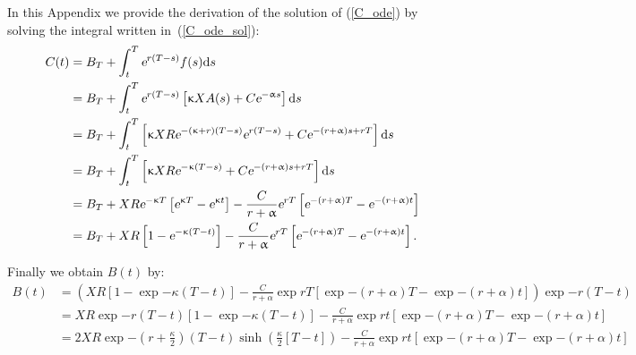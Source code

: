 In this Appendix we provide the derivation of the solution of (\ref{C_ode}) by solving the integral written in~(\ref{C_ode_sol}):
$$
\begin{aligned}
	C(t) 	&= B_T + \int_t^T \text{\sl e}^{r(T-s)}f(s)\text{\rm d} s\\
	&= B_T + \int_t^T \text{\sl e}^{r(T-s)}\left[\upkappa X A(s) + C\text{\sl e}^{-\upalpha s}\right]\text{\rm d} s\\
	&= B_T + \int_t^T \left[\upkappa X R \text{\sl e}^{- (\upkappa + r) (T-s)} \text{\sl e}^{r(T-s)} + C\text{\sl e}^{-(r+\upalpha)s+rT}\right]\text{\rm d} s\\
	&= B_T + \int_t^T \left[\upkappa X R \text{\sl e}^{-\upkappa (T-s)} + C\text{\sl e}^{-(r+\upalpha)s +rT}\right]\text{\rm d} s\\
	&= B_T + {X R \text{\sl e}^{-\upkappa T}}  \left[\text{\sl e}^{\upkappa T} - \text{\sl e}^{\upkappa t}\right] - \frac{C}{r+\upalpha}\text{\sl e}^{rT}\left[\text{\sl e}^{-(r+\upalpha)T}-\text{\sl e}^{-(r+\upalpha)t}\right]\\
	&= B_T + {X R}  \left[1 -  \text{\sl e}^{-\upkappa(T-t)}\right]- \frac{C}{r+\upalpha}\text{\sl e}^{rT}\left[\text{\sl e}^{-(r+\upalpha)T}-\text{\sl e}^{-(r+\upalpha)t}\right] .
\end{aligned}
$$

Finally we obtain $B(t)$ by:
\begin{equation}
	\begin{aligned}
		B(t) 	&= \left({X R}  \left[1 -  \exp{-\kappa(T-t)}\right]- \frac{C}{r+\alpha}\exp{rT}\left[\exp{-(r+\alpha)T}-\exp{-(r+\alpha)t}\right]\right) \exp{-r(T-t)}\\
		&= {X R\exp{-r(T-t)}} \left[1 -  \exp{- \kappa (T-t)}\right]- \frac{C}{r+\alpha}\exp{rt}\left[\exp{-(r+\alpha)T}-\exp{-(r+\alpha)t}\right]\\
		&= {2X R}\exp{-\left(r+\frac{\kappa}{2}\right)(T-t)}\sinh\left(\frac{\kappa}{2}[T-t]\right)- \frac{C}{r+\alpha}\exp{rt}\left[\exp{-(r+\alpha)T}-\exp{-(r+\alpha)t}\right]
	\end{aligned}
\end{equation}